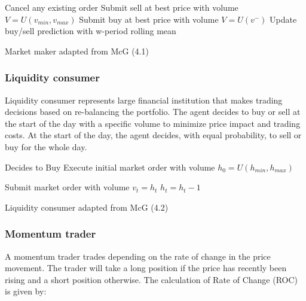 \documentclass{article}
\begin{document}
\begin{algorithm}[H]
\DontPrintSemicolon 
{} {
    Cancel any existing order\;
     {
    Submit sell at best price with volume $V=U(v_{min},v_{max})$\;
    Submit buy at best price with volume $V=U(v^{-})$\;
    }
    \EndIf
  }
\EndIf
Update buy/sell prediction with w-period rolling mean\; 
\caption{{\sc Market maker adapted from McG (4.1) \cite{McGroarty}} }
\label{algo:max}
\end{algorithm}

\subsubsection{Liquidity consumer}
Liquidity consumer represents large financial institution that makes trading decisions based on re-balancing the portfolio. The agent decides to buy or sell at the start of the day with a specific volume to minimize price impact and trading costs. At the start of the day, the agent decides, with equal probability, to sell or buy for the whole day.

\begin{algorithm}[H]
\DontPrintSemicolon 
{} {
     {
    Decides to Buy\;
    }
    \EndIf
    Execute initial market order with volume $h_0 = U(h_{min},h_{max})$\;  
  }
\EndIf

 {
    \tcc{$h_t = $ is the remaining volume at time t}
     {
    Submit market order with volume $v_t = h_t$\;
    }
    \EndIf
    $h_t = h_t - 1$\;  
  }
\EndIf
\caption{{\sc Liquidity consumer adapted from McG (4.2) \cite{McGroarty} }}
\label{algo:max}
\end{algorithm}

\subsubsection{Momentum trader}
A momentum trader trades depending on the rate of change in the price movement. The trader will take a long position if the price has recently been rising and a short position otherwise. The calculation of Rate of Change (ROC) is given by: 
\end{document}
